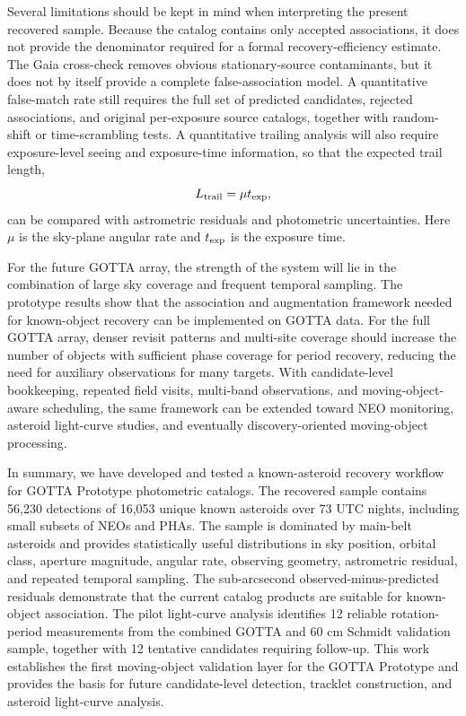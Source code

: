 \documentclass[referee]{raa}
\begin{document}
Several limitations should be kept in mind when interpreting the present recovered sample. Because the catalog contains only accepted associations, it does not provide the denominator required for a formal recovery-efficiency estimate. The Gaia cross-check removes obvious stationary-source contaminants, but it does not by itself provide a complete false-association model. A quantitative false-match rate still requires the full set of predicted candidates, rejected associations, and original per-exposure source catalogs, together with random-shift or time-scrambling tests. A quantitative trailing analysis will also require exposure-level seeing and exposure-time information, so that the expected trail length,
\begin{equation}
L_{\rm trail}=\mu t_{\rm exp},
\end{equation}
can be compared with astrometric residuals and photometric uncertainties. Here $\mu$ is the sky-plane angular rate and $t_{\rm exp}$ is the exposure time.

For the future GOTTA array, the strength of the system will lie in the combination of large sky coverage and frequent temporal sampling. The prototype results show that the association and augmentation framework needed for known-object recovery can be implemented on GOTTA data. For the full GOTTA array, denser revisit patterns and multi-site coverage should increase the number of objects with sufficient phase coverage for period recovery, reducing the need for auxiliary observations for many targets. With candidate-level bookkeeping, repeated field visits, multi-band observations, and moving-object-aware scheduling, the same framework can be extended toward NEO monitoring, asteroid light-curve studies, and eventually discovery-oriented moving-object processing.

In summary, we have developed and tested a known-asteroid recovery workflow for GOTTA Prototype photometric catalogs. The recovered sample contains 56,230 detections of 16,053 unique known asteroids over 73 UTC nights, including small subsets of NEOs and PHAs. The sample is dominated by main-belt asteroids and provides statistically useful distributions in sky position, orbital class, aperture magnitude, angular rate, observing geometry, astrometric residual, and repeated temporal sampling. The sub-arcsecond observed-minus-predicted residuals demonstrate that the current catalog products are suitable for known-object association. The pilot light-curve analysis identifies 12 reliable rotation-period measurements from the combined GOTTA and 60 cm Schmidt validation sample, together with 12 tentative candidates requiring follow-up. This work establishes the first moving-object validation layer for the GOTTA Prototype and provides the basis for future candidate-level detection, tracklet construction, and asteroid light-curve analysis.
\end{document}
